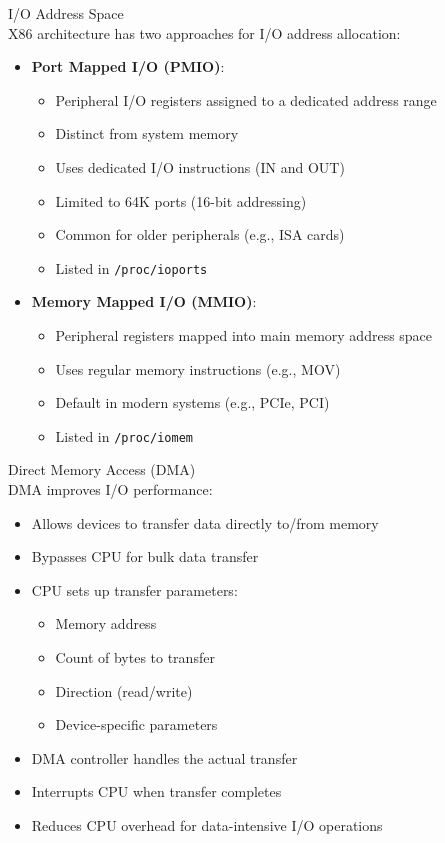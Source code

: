 \begin{definition}{I/O Address Space}\\
    X86 architecture has two approaches for I/O address allocation:
    \begin{itemize}
        \item \textbf{Port Mapped I/O (PMIO)}:
            \begin{itemize}
                \item Peripheral I/O registers assigned to a dedicated address range
                \item Distinct from system memory
                \item Uses dedicated I/O instructions (IN and OUT)
                \item Limited to 64K ports (16-bit addressing)
                \item Common for older peripherals (e.g., ISA cards)
                \item Listed in \texttt{/proc/ioports}
            \end{itemize}
        \item \textbf{Memory Mapped I/O (MMIO)}:
            \begin{itemize}
                \item Peripheral registers mapped into main memory address space
                \item Uses regular memory instructions (e.g., MOV)
                \item Default in modern systems (e.g., PCIe, PCI)
                \item Listed in \texttt{/proc/iomem}
            \end{itemize}
    \end{itemize}
\end{definition}

\begin{definition}{Direct Memory Access (DMA)}\\
    DMA improves I/O performance:
    \begin{itemize}
        \item Allows devices to transfer data directly to/from memory
        \item Bypasses CPU for bulk data transfer
        \item CPU sets up transfer parameters:
            \begin{itemize}
                \item Memory address
                \item Count of bytes to transfer
                \item Direction (read/write)
                \item Device-specific parameters
            \end{itemize}
        \item DMA controller handles the actual transfer
        \item Interrupts CPU when transfer completes
        \item Reduces CPU overhead for data-intensive I/O operations
    \end{itemize}
\end{definition}

